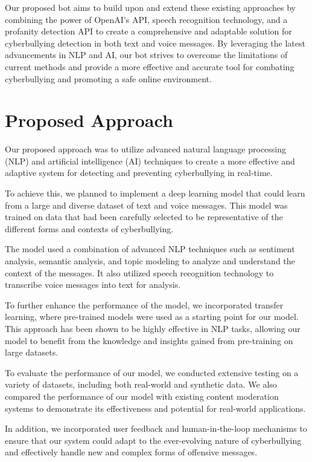 \documentclass[conference]{IEEEtran}
\begin{document}
Our proposed bot aims to build upon and extend these existing approaches by combining the power of OpenAI's API, speech recognition technology, and a profanity detection API to create a comprehensive and adaptable solution for cyberbullying detection in both text and voice messages. By leveraging the latest advancements in NLP and AI, our bot strives to overcome the limitations of current methods and provide a more effective and accurate tool for combating cyberbullying and promoting a safe online environment.





\section{Proposed Approach}

Our proposed approach was to utilize advanced natural language processing (NLP) and artificial intelligence (AI) techniques to create a more effective and adaptive system for detecting and preventing cyberbullying in real-time.

To achieve this, we planned to implement a deep learning model that could learn from a large and diverse dataset of text and voice messages. This model was trained on data that had been carefully selected to be representative of the different forms and contexts of cyberbullying.

The model used a combination of advanced NLP techniques such as sentiment analysis, semantic analysis, and topic modeling to analyze and understand the context of the messages. It also utilized speech recognition technology to transcribe voice messages into text for analysis.

To further enhance the performance of the model, we incorporated transfer learning, where pre-trained models were used as a starting point for our model. This approach has been shown to be highly effective in NLP tasks, allowing our model to benefit from the knowledge and insights gained from pre-training on large datasets.

To evaluate the performance of our model, we conducted extensive testing on a variety of datasets, including both real-world and synthetic data. We also compared the performance of our model with existing content moderation systems to demonstrate its effectiveness and potential for real-world applications.

In addition, we incorporated user feedback and human-in-the-loop mechanisms to ensure that our system could adapt to the ever-evolving nature of cyberbullying and effectively handle new and complex forms of offensive messages.
\end{document}
